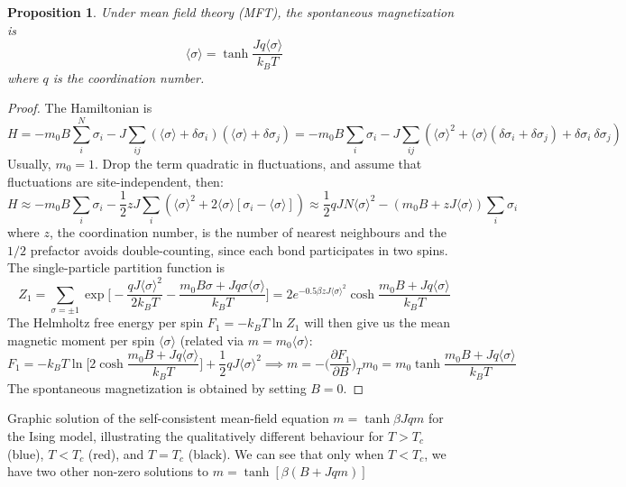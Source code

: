 \documentclass[a4paper]{article}
\theoremstyle{new}
\newtheorem{prop}{Proposition}[section]
\begin{document}
\begin{prop}
Under mean field theory (MFT), the spontaneous magnetization is
$$\langle\sigma\rangle=\tanh\frac{Jq\langle\sigma\rangle}{k_BT}$$
where $q$ is the coordination number.
\end{prop}
\begin{proof}
The Hamiltonian is
$$H=-m_0B\sum_i^N\sigma_i-J\sum_{ij}(\langle\sigma\rangle+\delta\sigma_i)(\langle\sigma\rangle+\delta\sigma_j)=-m_0B\sum_i\sigma_i-J\sum_{ij}(\langle\sigma\rangle^2+\langle\sigma\rangle(\delta\sigma_i+\delta\sigma_j)+\delta\sigma_i~\delta\sigma_j)$$
Usually, $m_0=1$. Drop the term quadratic in fluctuations, and assume that fluctuations are site-independent, then:
$$H\approx-m_0B\sum_i\sigma_i-\frac{1}{2}zJ\sum_i(\langle\sigma\rangle^2+2\langle\sigma\rangle[\sigma_i-\langle\sigma\rangle])\approx\frac{1}{2}qJN\langle\sigma\rangle^2-(m_0B+zJ\langle\sigma\rangle)\sum_i\sigma_i$$
where $z$, the coordination number, is the number of nearest neighbours and the $1/2$ prefactor avoids double-counting, since each bond participates in two spins. The single-particle partition function is
$$Z_1=\sum_{\sigma=\pm1}\exp\bigg[-\frac{qJ\langle\sigma\rangle^2}{2k_BT}-\frac{m_0B\sigma+Jq\sigma\langle\sigma\rangle}{k_BT}\bigg]=2e^{-0.5\beta zJ\langle\sigma\rangle^2}\cosh\frac{m_0B+Jq\langle\sigma\rangle}{k_BT}$$
The Helmholtz free energy per spin $F_1=-k_BT\ln Z_1$ will then give us the mean magnetic moment per spin $\langle\sigma\rangle$ (related via $m=m_0\langle\sigma\rangle$:
$$F_1=-k_BT\ln\bigg[2\cosh\frac{m_0B+Jq\langle\sigma\rangle}{k_BT}\bigg]+\frac{1}{2}qJ\langle\sigma\rangle^2\implies m=-\bigg(\frac{\partial F_1}{\partial B}\bigg)_Tm_0=m_0\tanh\frac{m_0B+Jq\langle\sigma\rangle}{k_BT}$$
The spontaneous magnetization is obtained by setting $B=0$.
\end{proof}
Graphic solution of the self-consistent mean-field equation $m=\tanh\beta Jqm$ for the Ising model, illustrating the qualitatively different behaviour for $T > T_c$ (blue), $T < T_c$ (red), and $T = T_c$ (black). We can see that only when $T<T_c$, we have two other non-zero solutions to $m=\tanh[\beta(B+Jqm)]$
\begin{center}
\end{center}
\end{document}

